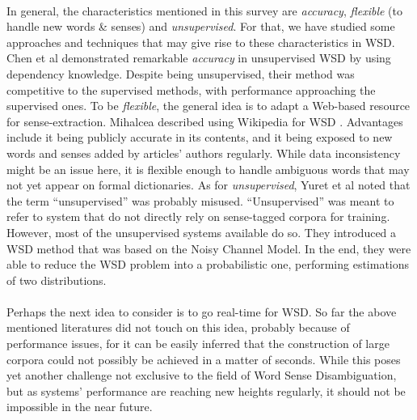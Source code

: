 \documentclass[12 pt]{article}
\begin{document}
\paragraph{}
In general, the characteristics mentioned in this survey are \textit{accuracy}, \textit{flexible} (to handle new words \& senses) and \textit{unsupervised}. For that, we have studied some approaches and techniques that may give rise to these characteristics in WSD.
Chen et al \cite{unsupervised} demonstrated remarkable \textit{accuracy} in unsupervised WSD by using dependency knowledge. Despite being unsupervised, their method was competitive to the supervised methods, with performance approaching the supervised ones.
To be \textit{flexible}, the general idea is to adapt a Web-based resource for sense-extraction. Mihalcea described using Wikipedia for WSD \cite{wikipedia}. Advantages include it being publicly accurate in its contents, and it being exposed to new words and senses added by articles' authors regularly. While data inconsistency might be an issue here, it is flexible enough to handle ambiguous words that may not yet appear on formal dictionaries.
As for \textit{unsupervised}, Yuret et al \cite{noisychannel} noted that the term ``unsupervised'' was probably misused. ``Unsupervised'' was meant to refer to system that do not directly rely on sense-tagged corpora for training. However, most of the unsupervised systems available do so. They introduced a WSD method that was based on the Noisy Channel Model. In the end, they were able to reduce the WSD problem into a probabilistic one, performing estimations of two distributions.

\paragraph{}
Perhaps the next idea to consider is to go real-time for WSD. So far the above mentioned literatures did not touch on this idea, probably because of performance issues, for it can be easily inferred that the construction of large corpora could not possibly be achieved in a matter of seconds. While this poses yet another challenge not exclusive to the field of Word Sense Disambiguation, but as systems' performance are reaching new heights regularly, it should not be impossible in the near future.


\end{document}
